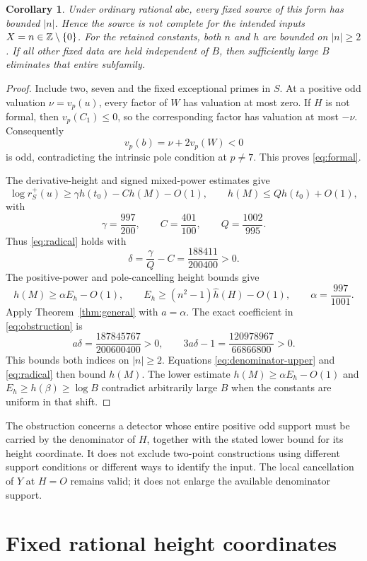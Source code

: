 \documentclass[11pt,a4paper]{article}
\newtheorem{corollary}[theorem]{Corollary}
\begin{document}
\begin{corollary}\label{cor:application}
Under ordinary rational $abc$, every fixed source of this form
has bounded $|n|$. Hence the source is not complete for the
intended inputs $X=n\in\mathbb Z\setminus\{0\}$.
For the retained constants, both $n$ and $h$ are bounded on
$|n|\ge2$. If all other fixed data are held independent of
$B$, then sufficiently large $B$ eliminates that entire
subfamily.
\end{corollary}
\begin{proof}
Include two, seven and the fixed exceptional primes in $S$.
At a positive odd valuation $\nu=v_p(u)$, every factor of
$W$ has valuation at most zero. If $H$ is not formal, then
$v_p(C_1)\le0$, so the corresponding factor has valuation
at most $-\nu$. Consequently
\[
                       v_p(b)=\nu+2v_p(W)<0
\]
is odd, contradicting the intrinsic pole condition at $p\ne7$.
This proves \eqref{eq:formal}.

The derivative-height and signed mixed-power estimates
\cite{Derivative,Height} give
\[
 \log r_S^+(u)\ge\gamma h(t_0)-C h(M)-O(1),\qquad
 h(M)\le Qh(t_0)+O(1),
\]
with
\[
 \gamma=\frac{997}{200},\qquad C=\frac{401}{100},\qquad
 Q=\frac{1002}{995}.
\]
Thus \eqref{eq:radical} holds with
\[
               \delta=\frac\gamma Q-C=\frac{188411}{200400}>0.
\]
The positive-power and pole-cancelling height bounds
\cite{Height,Cancellation} give
\[
 h(M)\ge\alpha E_h-O(1),\qquad
 E_h\ge(n^2-1)\widehat h(H)-O(1),\qquad
 \alpha=\frac{997}{1001}.
\]
Apply Theorem~\ref{thm:general} with $a=\alpha$. The exact
coefficient in \eqref{eq:obstruction} is
\[
             a\delta=\frac{187845767}{200600400}>0,
 \qquad 3a\delta-1=\frac{120978967}{66866800}>0.
\]
This bounds both indices on $|n|\ge2$. Equations
\eqref{eq:denominator-upper} and \eqref{eq:radical} then
bound $h(M)$. The lower estimate $h(M)\ge\alpha E_h-O(1)$
and $E_h\ge h(\beta)\ge\log B$ contradict arbitrarily large
$B$ when the constants are uniform in that shift.
\end{proof}

The obstruction concerns a detector whose entire positive odd
support must be carried by the denominator of $H$, together
with the stated lower bound for its height coordinate. It does
not exclude two-point constructions using different support
conditions or different ways to identify the input. The local
cancellation of $Y$ at $H=O$ remains valid; it does not enlarge
the available denominator support.

\section{Fixed rational height coordinates}
\end{document}
